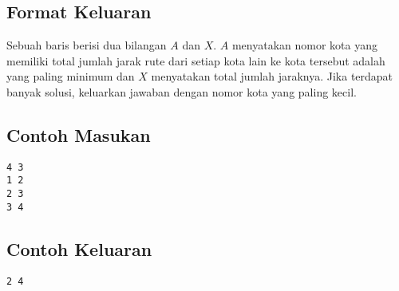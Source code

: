 \documentclass{article}
\begin{document}
\subsection*{Format Keluaran}
Sebuah baris berisi dua bilangan $A$ dan $X$. $A$ menyatakan nomor kota yang memiliki total jumlah jarak rute dari setiap kota lain ke kota tersebut adalah yang paling minimum dan $X$ menyatakan total jumlah jaraknya. Jika terdapat banyak solusi, keluarkan jawaban dengan nomor kota yang paling kecil.
\\

\begin{multicols}{2}
\subsection*{Contoh Masukan}
\begin{lstlisting}
4 3
1 2
2 3
3 4
\end{lstlisting}
\columnbreak
\subsection*{Contoh Keluaran}
\begin{lstlisting}
2 4
\end{lstlisting}
\vfill
\null
\end{multicols}




\pagebreak
\end{document}
